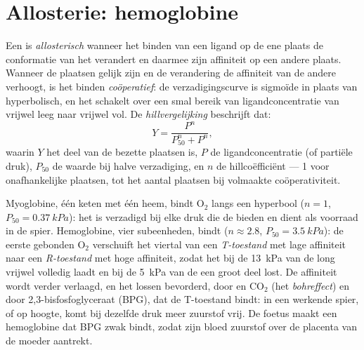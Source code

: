 \section{Allosterie: hemoglobine}

\begin{definition}\label{def:b1:proteins:allostery}
Een  is \emph{allosterisch} wanneer het binden van een
ligand op de ene plaats de conformatie van het  verandert en daarmee zijn
affiniteit op een andere plaats. Wanneer de plaatsen gelijk zijn en de verandering
de affiniteit van de andere verhoogt, is het binden
\emph{coöperatief}: de verzadigingscurve is sigmoïde in
plaats van hyperbolisch, en het  schakelt over een smal bereik van
ligandconcentratie van vrijwel leeg naar vrijwel vol. De
\emph{hillvergelijking} beschrijft dat:
\[
Y = \frac{P^n}{P_{50}^n + P^n},
\]
waarin $Y$ het deel van de bezette plaatsen is, $P$ de ligandconcentratie (of
partiële druk), $P_{50}$ de waarde bij halve verzadiging, en $n$ de
hillcoëfficiënt --- 1 voor onafhankelijke plaatsen, tot het aantal plaatsen bij
volmaakte coöperativiteit.
\end{definition}

\begin{proposition}\label{prop:b1:proteins:hemoglobin}
Myoglobine, één keten met één heem, bindt $\mathrm{O_2}$ langs een hyperbool
($n = 1$, $P_{50} = \qty{0.37}{kPa}$): het is verzadigd bij elke druk die de
 bieden en dient als voorraad in de spier. Hemoglobine, vier
subeenheden, bindt  ($n \approx 2.8$, $P_{50} = \qty{3.5}{kPa}$): de
eerste gebonden $\mathrm{O_2}$ verschuift het viertal van een \emph{T-toestand}
met lage affiniteit naar een \emph{R-toestand} met hoge affiniteit, zodat het bij
de \qty{13}{kPa} van de long vrijwel volledig laadt en bij de \qty{5}{kPa} van de
 een groot deel lost. De affiniteit wordt verder verlaagd, en het lossen
bevorderd, door  en $\mathrm{CO_2}$ (het \emph{bohreffect}) en door
2,3-bisfosfoglyceraat (BPG), dat de T-toestand bindt: in een werkende spier, of op
hoogte, komt bij dezelfde druk meer zuurstof vrij. De foetus maakt een hemoglobine
dat BPG zwak bindt, zodat zijn bloed zuurstof over de placenta van de moeder
aantrekt.
\end{proposition}

